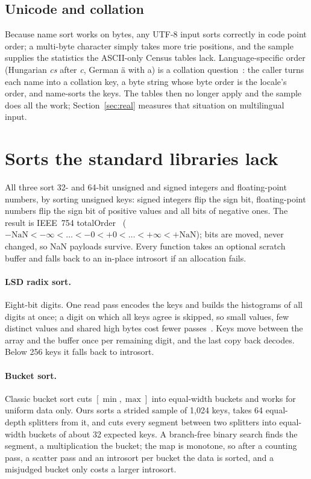 \documentclass[11pt]{article}
\theoremstyle{definition}
\begin{document}
\subsection{Unicode and collation}

Because name sort works on bytes, any UTF-8 input sorts correctly in code
point order; a multi-byte character simply takes more trie positions, and
the sample supplies the statistics the ASCII-only Census tables lack.
Language-specific order (Hungarian \emph{cs} after \emph{c}, German \"a with
a) is a collation question~\cite{uts10}: the caller turns each name into a
collation key, a byte string whose byte order is the locale's order, and
name-sorts the keys. The tables then no longer apply and the sample does all
the work; Section~\ref{sec:real} measures that situation on multilingual
input.

\section{Sorts the standard libraries lack}\label{sec:numeric}

All three sort 32- and 64-bit unsigned and signed integers and
floating-point numbers, by sorting unsigned keys: signed integers flip the
sign bit, floating-point numbers flip the sign bit of positive values and all
bits of negative ones. The result is IEEE~754 totalOrder~\cite{ieee754}
($-\mathrm{NaN} < -\infty < \dots < -0 < +0 < \dots < +\infty <
+\mathrm{NaN}$); bits are moved, never changed, so NaN payloads survive.
Every function takes an optional scratch buffer and falls back to an in-place
introsort if an allocation fails.

\paragraph{LSD radix sort.} Eight-bit digits. One read pass encodes the keys
and builds the histograms of all digits at once; a digit on which all keys
agree is skipped, so small values, few distinct values and shared high bytes
cost fewer passes~\cite{knuth1998taocp3}. Keys move between the array and the
buffer once per remaining digit, and the last copy back decodes. Below 256
keys it falls back to introsort.

\paragraph{Bucket sort.} Classic bucket sort cuts $[\min, \max]$ into
equal-width buckets and works for uniform data only. Ours sorts a strided
sample of 1{,}024 keys, takes 64 equal-depth splitters from it, and cuts
every segment between two splitters into equal-width buckets of about 32
expected keys. A branch-free binary search finds the segment, a
multiplication the bucket; the map is monotone, so after a counting pass, a
scatter pass and an introsort per bucket the data is sorted, and a
misjudged bucket only costs a larger introsort.
\end{document}
